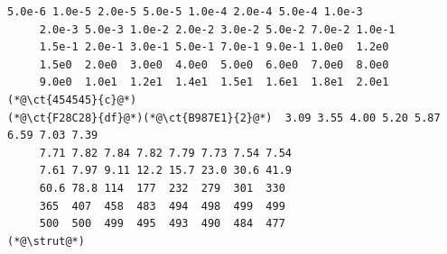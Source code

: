 \begin{lstlisting}[firstnumber=last]
     5.0e-6 1.0e-5 2.0e-5 5.0e-5 1.0e-4 2.0e-4 5.0e-4 1.0e-3
     2.0e-3 5.0e-3 1.0e-2 2.0e-2 3.0e-2 5.0e-2 7.0e-2 1.0e-1
     1.5e-1 2.0e-1 3.0e-1 5.0e-1 7.0e-1 9.0e-1 1.0e0  1.2e0
     1.5e0  2.0e0  3.0e0  4.0e0  5.0e0  6.0e0  7.0e0  8.0e0
     9.0e0  1.0e1  1.2e1  1.4e1  1.5e1  1.6e1  1.8e1  2.0e1
(*@\ct{454545}{c}@*)
(*@\ct{F28C28}{df}@*)(*@\ct{B987E1}{2}@*)  3.09 3.55 4.00 5.20 5.87 6.59 7.03 7.39
     7.71 7.82 7.84 7.82 7.79 7.73 7.54 7.54
     7.61 7.97 9.11 12.2 15.7 23.0 30.6 41.9
     60.6 78.8 114  177  232  279  301  330
     365  407  458  483  494  498  499  499
     500  500  499  495  493  490  484  477
(*@\strut@*)
\end{lstlisting}
